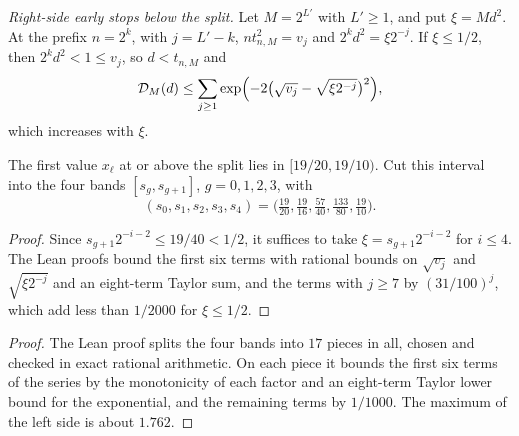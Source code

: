 \emph{Right-side early stops below the split.}
Let $M=2^{L'}$ with $L'\ge1$, and put $\xi=Md^2$. At the prefix $n=2^k$,
with $j=L'-k$, $nt_{n,M}^2=v_j$ and $2^kd^2=\xi2^{-j}$. If $\xi\le1/2$, then
$2^kd^2<1\le v_j$, so $d<t_{n,M}$ and
\[
 \mathcal D_M(d)\le\sum_{j\ge1}
 \exp\Bigl(-2\bigl(\sqrt{v_j}-\sqrt{\xi2^{-j}}\bigr)^2\Bigr),
\]
which increases with $\xi$.

The first value $x_\ell$ at or above the split lies in $[19/20,19/10)$.
Cut this interval into the four bands $[s_g,s_{g+1}]$, $g=0,1,2,3$, with
\[
 (s_0,s_1,s_2,s_3,s_4)=\bigl(\tfrac{19}{20},\tfrac{19}{16},\tfrac{57}{40},
 \tfrac{133}{80},\tfrac{19}{10}\bigr).
\]


\begin{proof}
Since $s_{g+1}2^{-i-2}\le19/40<1/2$, it suffices to take
$\xi=s_{g+1}2^{-i-2}$ for $i\le4$. The Lean proofs bound the first six
terms with rational bounds on $\sqrt{v_j}$ and $\sqrt{\xi2^{-j}}$ and an
eight-term Taylor sum, and the terms with $j\ge7$ by $(31/100)^j$, which
add less than $1/2000$ for $\xi\le1/2$.
\end{proof}


\begin{proof}
The Lean proof splits the four bands into $17$ pieces in all, chosen and
checked in exact rational arithmetic. On each piece it bounds the first six
terms of the series by the monotonicity of each factor and an eight-term
Taylor lower bound for the exponential, and the remaining terms by
$1/1000$. The maximum of the left side is about $1.762$.
\end{proof}

